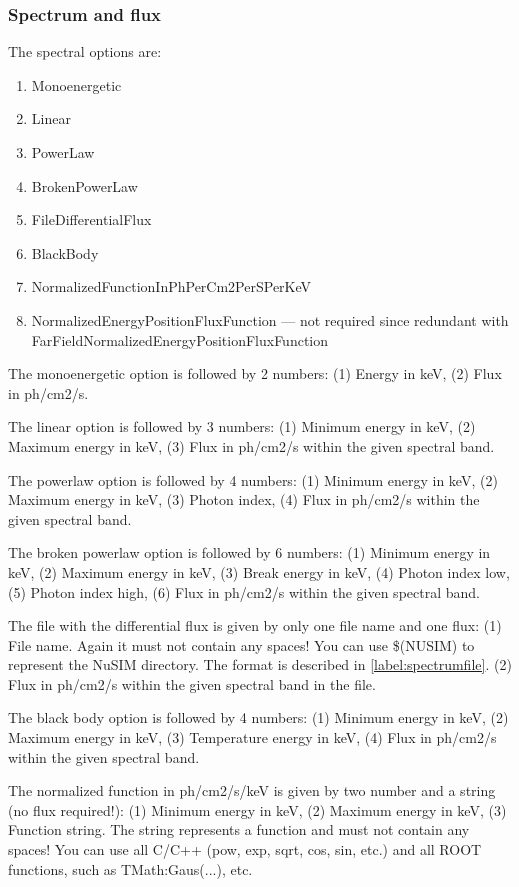 \subsubsection{Spectrum and flux}

The spectral options are:
\begin{enumerate}
\item Monoenergetic
\item Linear
\item PowerLaw
\item BrokenPowerLaw
\item FileDifferentialFlux
\item BlackBody
\item NormalizedFunctionInPhPerCm2PerSPerKeV
\item NormalizedEnergyPositionFluxFunction --- not required since redundant with FarFieldNormalizedEnergyPositionFluxFunction
\end{enumerate}


The monoenergetic option is followed by 2 numbers: 
(1) Energy in keV, 
(2) Flux in ph/cm2/s.

The linear option is followed by 3 numbers: 
(1) Minimum energy in keV, 
(2) Maximum energy in keV, 
(3) Flux in ph/cm2/s within the given spectral band.

The powerlaw option is followed by 4 numbers: 
(1) Minimum energy in keV, 
(2) Maximum energy in keV, 
(3) Photon index, 
(4) Flux in ph/cm2/s within the given spectral band.

The broken powerlaw option is followed by 6 numbers: 
(1) Minimum energy in keV,  
(2) Maximum energy in keV, 
(3) Break energy in keV, 
(4) Photon index low, 
(5) Photon index high, 
(6) Flux in ph/cm2/s within the given spectral band.

The file with the differential flux is given by only one file name and one flux: 
(1) File name. Again it must not contain any spaces! You can use \$(NUSIM) to represent the NuSIM directory.  The format is described in \ref{label:spectrumfile}.
(2) Flux in ph/cm2/s within the given spectral band in the file.

The black body option is followed by 4 numbers: 
(1) Minimum energy in keV, 
(2) Maximum energy in keV, 
(3) Temperature energy in keV, 
(4) Flux in ph/cm2/s within the given spectral band.

The normalized function in ph/cm2/s/keV is given by two number and a string (no flux required!): 
(1) Minimum energy in keV, 
(2) Maximum energy in keV, 
(3) Function string.
The string represents a function and must not contain any spaces!
You can use all C/C++ (pow, exp, sqrt, cos, sin, etc.) and all ROOT functions, such as TMath:Gaus(...), etc.


